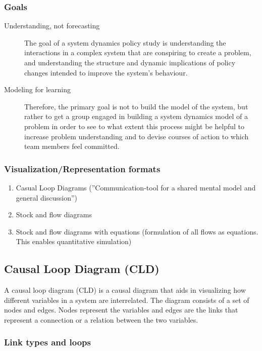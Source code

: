\subsubsection{Goals}

\begin{description}
	\item[Understanding, not forecasting]
	The goal of a system dynamics policy study is understanding the
	interactions in a complex system that are conspiring to create a
	problem, and understanding the structure and dynamic implications of
	policy changes intended to improve the system's behaviour.
	\item[Modeling for learning]
	Therefore, the primary goal is not to build the model of the system, but
	rather to get a group engaged in building a system dynamics model of a
	problem in order to see to what extent this process might be helpful to
	increase problem understanding and to devise courses of action to which
	team members feel committed.
\end{description}

\subsubsection{Visualization/Representation formats}

\begin{enumerate}
	\item Casual Loop Diagrams (''Communication-tool for a shared mental model
	and general discussion'')
	\item Stock and flow diagrams
	\item Stock and flow diagrams with equations (formulation of all flows as
	equations. This enables quantitative simulation)
\end{enumerate}

\subsection{Causal Loop Diagram (CLD)}

A causal loop diagram (CLD) is a causal diagram that aids in visualizing how
different variables in a system are interrelated. The diagram consists of a set
of nodes and edges. Nodes represent the variables and edges are the links that
represent a connection or a relation between the two variables.

\subsubsection{Link types and loops}

